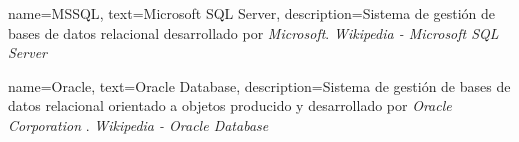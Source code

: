 {
    name={MSSQL},
    text={Microsoft SQL Server},
    description={Sistema de gestión de bases de datos relacional desarrollado por \textit{Microsoft}. \textit{Wikipedia - Microsoft SQL Server} \cite{wikimssql}}
}

{
    name={Oracle},
    text={Oracle Database},
    description={Sistema de gestión de bases de datos relacional orientado a objetos producido y desarrollado por \textit{Oracle Corporation} \cite{oraclecorporation}. \textit{Wikipedia - Oracle Database} \cite{wikioracle}}
}





